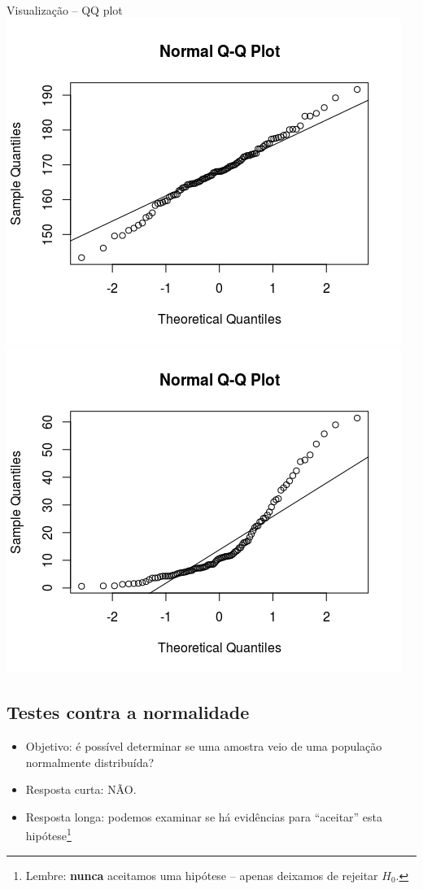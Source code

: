 \documentclass{beamer}
\begin{document}
\begin{frame}{\scriptsize Visualização -- QQ plot}
  \includegraphics[height=.5\textheight]{Cap37-38/normal-qq}
  \includegraphics[height=.5\textheight]{Cap37-38/lognormal-qq}
\end{frame}

\subsection[Normalidade]{Testes contra a normalidade}

\begin{frame}{\scriptsize }
  \begin{itemize}
    \footnotesize
  \item Objetivo: é possível \alert{determinar} se uma amostra veio de uma população normalmente distribuída?
  \item<2-> Resposta curta: \alert<3->{NÃO}.
    \bigskip
    \bigskip
  \item<4-> Resposta longa: podemos examinar se há evidências para ``aceitar'' esta hipótese\footnote{\tiny Lembre: {\bf nunca} aceitamos uma hipótese -- apenas deixamos de rejeitar $H_0$.}
  \end{itemize}
\end{frame}
\end{document}
